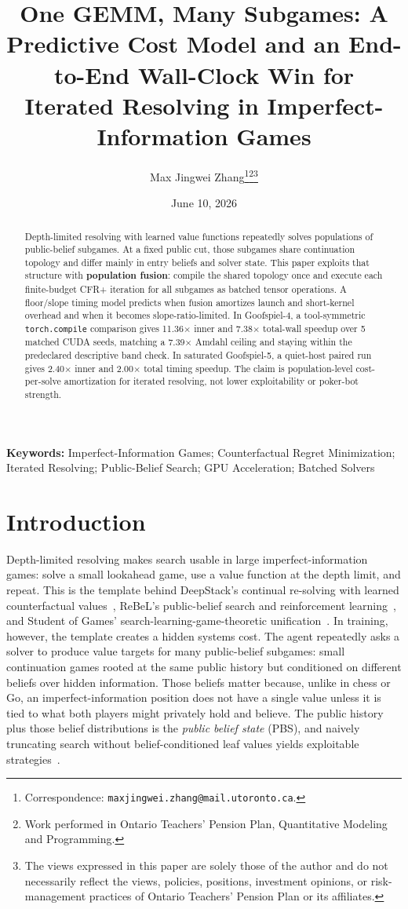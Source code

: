 \documentclass[11pt]{article}
\title{One GEMM, Many Subgames: A Predictive Cost Model and an End-to-End
Wall-Clock Win for Iterated Resolving in Imperfect-Information Games}
\author[1,2]{Max Jingwei Zhang\thanks{Correspondence: \texttt{maxjingwei.zhang@mail.utoronto.ca}.}\thanks{Work performed in Ontario Teachers' Pension Plan, Quantitative Modeling and Programming.}\thanks{The views expressed in this paper are solely those of the author and do not necessarily reflect the views, policies, positions, investment opinions, or risk-management practices of Ontario Teachers' Pension Plan or its affiliates.}}
\affil[1]{Ontario Teachers' Pension Plan}
\affil[2]{University of Toronto, Faculty of Applied Science and Engineering}
\date{June 10, 2026}
\begin{document}
\maketitle

\begin{center}
\small
\textbf{Keywords:} Imperfect-Information Games; Counterfactual Regret Minimization;
Iterated Resolving; Public-Belief Search; GPU Acceleration; Batched Solvers
\end{center}

\begin{abstract}
Depth-limited resolving with learned value functions repeatedly solves populations of
public-belief subgames. At a fixed public cut, those subgames share continuation
topology and differ mainly in entry beliefs and solver state. This paper exploits that
structure with \textbf{population fusion}: compile the shared topology once and execute
each finite-budget CFR+ iteration for all subgames as batched tensor operations. A
floor/slope timing model predicts when fusion amortizes launch and short-kernel overhead
and when it becomes slope-ratio-limited. In Goofspiel-4, a tool-symmetric
\texttt{torch.compile} comparison gives 11.36$\times$ inner and 7.38$\times$ total-wall
speedup over 5 matched CUDA seeds, matching a 7.39$\times$ Amdahl ceiling and staying
within the predeclared descriptive band check. In saturated Goofspiel-5, a quiet-host
paired run gives 2.40$\times$ inner and 2.00$\times$ total timing speedup. The claim is
population-level cost-per-solve amortization for iterated resolving, not lower
exploitability or poker-bot strength.
\end{abstract}

\section{Introduction}

Depth-limited resolving makes search usable in large imperfect-information games: solve
a small lookahead game, use a value function at the depth limit, and repeat. This is the
template behind DeepStack's continual re-solving with learned counterfactual
values~\citep{Moravcik2017}, ReBeL's public-belief search and reinforcement
learning~\citep{Brown2020}, and Student of Games' search-learning-game-theoretic
unification~\citep{Schmid2023}. In training, however, the template creates a hidden
systems cost. The agent repeatedly asks a solver to produce value targets for many
public-belief subgames: small continuation games rooted at the same public history but
conditioned on different beliefs over hidden information. Those beliefs matter because,
unlike in chess or Go, an imperfect-information position does not have a single value
unless it is tied to what both players might privately hold and believe. The public
history plus those belief distributions is the \emph{public belief state} (PBS), and
naively truncating search without belief-conditioned leaf values yields exploitable
strategies~\citep{BrownSandholm2018}.
\end{document}
